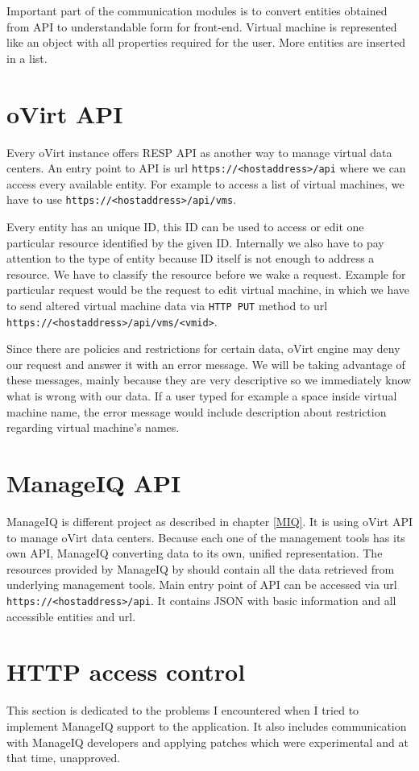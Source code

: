 Important part of the communication modules is to convert entities obtained from API to understandable form for front-end. Virtual machine is represented like an object with all properties required for the user. More entities are inserted in a list.

\section{oVirt API}
Every oVirt instance offers RESP API as another way to manage virtual data centers. An entry point to API is url \texttt{https://<hostaddress>/api} where we can access every available entity. For example to access a list of virtual machines, we have to use \texttt{https://<hostaddress>/api/vms}.

Every entity has an unique ID, this ID can be used to access or edit one particular resource identified by the given ID. Internally we also have to pay attention to the type of entity because ID itself is not enough to address a resource. We have to classify the resource before we wake a request. Example for particular request would be the request to edit virtual machine, in which we have to send altered virtual machine data via \texttt{HTTP PUT} method to url \texttt{https://<hostaddress>/api/vms/<vmid>}.

Since there are policies and restrictions for certain data, oVirt engine may deny our request and answer it with an error message. We will be taking advantage of these messages, mainly because they are very descriptive so we immediately know what is wrong with our data. If a user typed for example a space inside virtual machine name, the error message would include description about restriction regarding virtual machine's names. 

\section{ManageIQ API}\label{miq}
ManageIQ is different project as described in chapter \ref{MIQ}. It is using oVirt API to manage oVirt data centers. Because each one of the management tools has its own API, ManageIQ converting data to its own, unified representation. The resources provided by ManageIQ by should contain all the data retrieved from underlying management tools.
Main entry point of API can be accessed via url \texttt{https://<hostaddress>/api}. It contains JSON with basic information and all accessible entities and url. 


\section{HTTP access control}
This section is dedicated to the problems I encountered when I tried to implement ManageIQ support to the application. It also includes communication with ManageIQ developers and applying patches which were experimental and at that time, unapproved.

